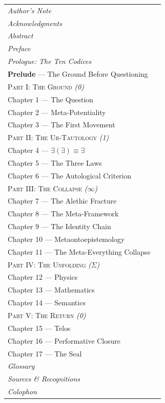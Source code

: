 \documentclass[10pt, openany, oneside]{book}
\renewcommand{\small}{\fontsize{9}{11.5}\selectfont}
\begin{document}
{\small
\noindent\begin{tabular}{@{} l @{\hspace{1em}} r @{}}
\textit{Author's Note} & \\
\textit{Acknowledgments} & \\
\textit{Abstract} & \\
\textit{Preface} & \\
\textit{Prologue: The Ten Codices} & \\[0.5em]
\textbf{Prelude} --- The Ground Before Questioning & \\[0.8em]

\textsc{Part I: The Ground} \textit{(0)} & \\[0.3em]
\quad Chapter 1 --- The Question & \\
\quad Chapter 2 --- Meta-Potentiality & \\
\quad Chapter 3 --- The First Movement & \\[0.8em]

\textsc{Part II: The Ur-Tautology} \textit{(1)} & \\[0.3em]
\quad Chapter 4 --- $\exists(\exists) \equiv \exists$ & \\
\quad Chapter 5 --- The Three Laws & \\
\quad Chapter 6 --- The Autological Criterion & \\[0.8em]

\textsc{Part III: The Collapse} \textit{($\infty$)} & \\[0.3em]
\quad Chapter 7 --- The Alethic Fracture & \\
\quad Chapter 8 --- The Meta-Framework & \\
\quad Chapter 9 --- The Identity Chain & \\
\quad Chapter 10 --- Metaontoepistemology & \\
\quad Chapter 11 --- The Meta-Everything Collapse & \\[0.8em]

\textsc{Part IV: The Unfolding} \textit{($\Sigma$)} & \\[0.3em]
\quad Chapter 12 --- Physics & \\
\quad Chapter 13 --- Mathematics & \\
\quad Chapter 14 --- Semantics & \\[0.8em]

\textsc{Part V: The Return} \textit{(0)} & \\[0.3em]
\quad Chapter 15 --- Telos & \\
\quad Chapter 16 --- Performative Closure & \\
\quad Chapter 17 --- The Seal & \\[0.8em]

\textit{Glossary} & \\
\textit{Sources \& Recognitions} & \\
\textit{Colophon} & \\
\end{tabular}
}
\end{document}
